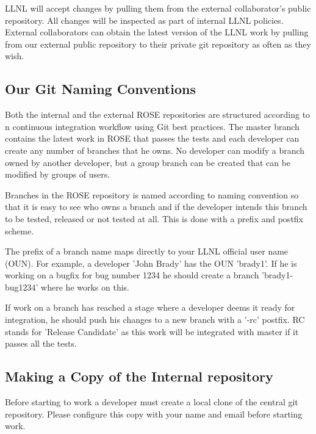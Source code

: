LLNL will accept changes by pulling them from the external collaborator's
public repository.  All changes will be inspected as part of internal 
LLNL policies. External collaborators can obtain the latest version of
the LLNL work by pulling from our external public repository to their
private git repository as often as they wish.



\subsection{Our Git Naming Conventions}

Both the internal and the external ROSE repositories are structured according to
n continuous integration workflow using Git best practices. The master branch
contains the latest work in ROSE that passes the tests and each developer can
create any number of branches that he owns. No developer can modify
a branch owned by another developer, but a group branch can be created that
can be modified by groups of users.

Branches in the ROSE repository is named according to naming convention so that
it is easy to see who owns a branch and if the developer intends this branch to
be tested, released or not tested at all. This is done with a prefix and postfix
scheme.

The prefix of a branch name maps directly to your LLNL official user name (OUN).
For example, a developer 'John Brady' has the OUN 'brady1'. If he is working on
a bugfix for bug number 1234 he should create a branch 'brady1-bug1234'
where he works on this.

If work on a branch has reached a stage where a developer deems it ready for
integration, he should push his changes to a new branch with a '-rc' postfix. RC
stands for 'Release Candidate' as this work will be integrated with master if it
passes all the tests.


\subsection{Making a Copy of the Internal repository}


Before starting to work a developer must create a local clone of the central git repository.
Please configure this copy with your name and email before starting work.

